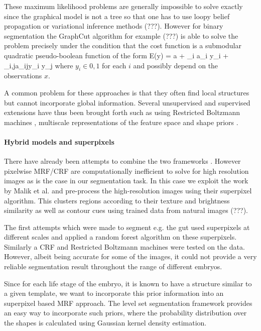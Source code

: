 \documentclass{article} %
\begin{document}
These maximum likelihood problems are generally impossible to solve exactly since the graphical model is not a tree so that one has to use loopy belief propagation or variational inference methods (???). However for binary segmentation the GraphCut algorithm for example (???) is able to solve the problem precisely under the condition that the cost function is a submodular quadratic pseudo-boolean function of the form
\beqs
E(y) = a + \sum_i a_i y_i + \sum_{i,j}a_{ij}y_i y_j
\eeqs
where $y_i\in {0,1}$ for each $i$ and possibly depend on the observations $x$. 

A common problem for these approaches is that they often find local structures but cannot incorporate global information. Several unsupervised and supervised extensions have thus been brought forth such as using Restricted Boltzmann machines \cite{KaeSohn13_CRF}, multiscale representations of the feature space \cite{He04_MultiScale} and shape priors \cite{Lempitsky_BranchMin}.


\paragraph{Hybrid models and superpixels}
There have already been attempts to combine the two frameworks \cite{Huang04_MRFDM, Chen12_MIGraphCut, Uzunbas13_MultiOrgan, Schlesinger13}. 
However pixelwise MRF/CRF are computationally inefficient to solve for high resolution images as is the case in our segmentation task. In this case we exploit the work by Malik et al. \cite{Malik_Superpixel} and pre-process the high-resolution images using their superpixel algorithm. This clusters regions according to their texture and brightness similarity as well as contour cues using trained data from natural images (???).

The first attempts which were made to segment e.g. the gut used superpixels at different scales and applied a random forest algorithm on these superpixels. Similarly a CRF and Restricted Boltzmann machines were tested on the data. However, albeit being accurate for some of the images, it could not provide a very reliable segmentation result throughout the range of different embryos. 

Since for each life stage of the embryo, it is known to have a structure similar to a given template, we want to incorporate this prior information into an superpixel based MRF approach.  
The level set segmentation framework provides an easy way to incorporate such priors, where the probability distribution over the shapes is calculated using Gaussian kernel density estimation.
\end{document}
